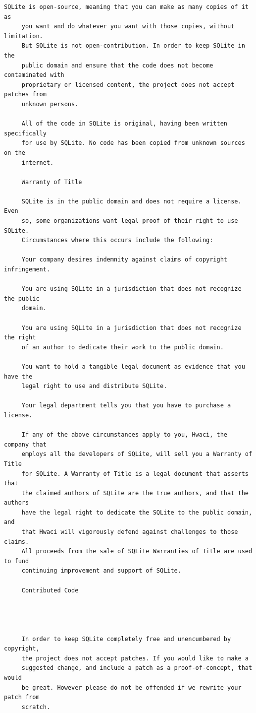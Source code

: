 \begin{lstlisting}[basicstyle=\ttfamily\footnotesize,breaklines=true]
     SQLite is open-source, meaning that you can make as many copies of it as
     you want and do whatever you want with those copies, without limitation.
     But SQLite is not open-contribution. In order to keep SQLite in the
     public domain and ensure that the code does not become contaminated with
     proprietary or licensed content, the project does not accept patches from
     unknown persons.

     All of the code in SQLite is original, having been written specifically
     for use by SQLite. No code has been copied from unknown sources on the
     internet.

     Warranty of Title

     SQLite is in the public domain and does not require a license. Even
     so, some organizations want legal proof of their right to use SQLite.
     Circumstances where this occurs include the following:

     Your company desires indemnity against claims of copyright infringement.

     You are using SQLite in a jurisdiction that does not recognize the public
     domain.

     You are using SQLite in a jurisdiction that does not recognize the right
     of an author to dedicate their work to the public domain.

     You want to hold a tangible legal document as evidence that you have the
     legal right to use and distribute SQLite.

     Your legal department tells you that you have to purchase a license.

     If any of the above circumstances apply to you, Hwaci, the company that
     employs all the developers of SQLite, will sell you a Warranty of Title
     for SQLite. A Warranty of Title is a legal document that asserts that
     the claimed authors of SQLite are the true authors, and that the authors
     have the legal right to dedicate the SQLite to the public domain, and
     that Hwaci will vigorously defend against challenges to those claims.
     All proceeds from the sale of SQLite Warranties of Title are used to fund
     continuing improvement and support of SQLite.

     Contributed Code




     In order to keep SQLite completely free and unencumbered by copyright,
     the project does not accept patches. If you would like to make a
     suggested change, and include a patch as a proof-of-concept, that would
     be great. However please do not be offended if we rewrite your patch from
     scratch.
\end{lstlisting}

